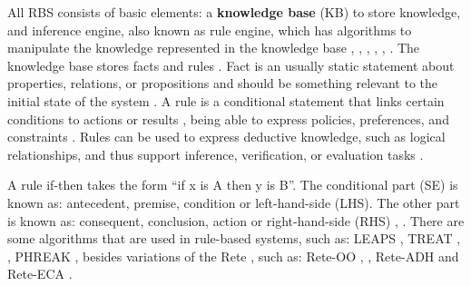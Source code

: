 All RBS consists of basic elements: a \textbf{knowledge base} (KB) to store knowledge, and inference engine, also known as rule engine, which has algorithms to manipulate the knowledge represented in the knowledge base \cite{grosan2011}, \cite{lucas1991}, \cite{gallacher1989}, \cite{hayesRoth1985}, \cite{buchanan1983}, \cite{abraham2005}. The knowledge base stores facts and rules \cite{hayesRoth1985}. Fact is an usually static statement about properties, relations, or propositions \cite{hayesRoth1985} and should be something relevant to the initial state of the system \cite{grosan2011}. A rule is a conditional statement that links certain conditions to actions or results \cite{abraham2005}, being able to express policies, preferences, and constraints \cite{gilman2015}. Rules can be used to express deductive knowledge, such as logical relationships, and thus support inference, verification, or evaluation tasks \cite{hayesRoth1985}.


A rule if-then takes the form ``if x is A then y is B''. The conditional part (SE) is known as: antecedent, premise, condition or left-hand-side (LHS). The other part is known as: consequent, conclusion, action or right-hand-side (RHS) \cite{grosan2011}, \cite{abraham2005}. There are some algorithms that are used in rule-based systems, such as: LEAPS \cite{batory1994}, TREAT \cite{wang1992}, \cite{miranker1991}, PHREAK \cite{salatino2016}, besides variations of the Rete \cite{forgy1982}, such as: Rete-OO \cite{sottara2010}, \cite{salatino2016}, Rete-ADH \cite{kim2014} and Rete-ECA \cite{lee2014}.

